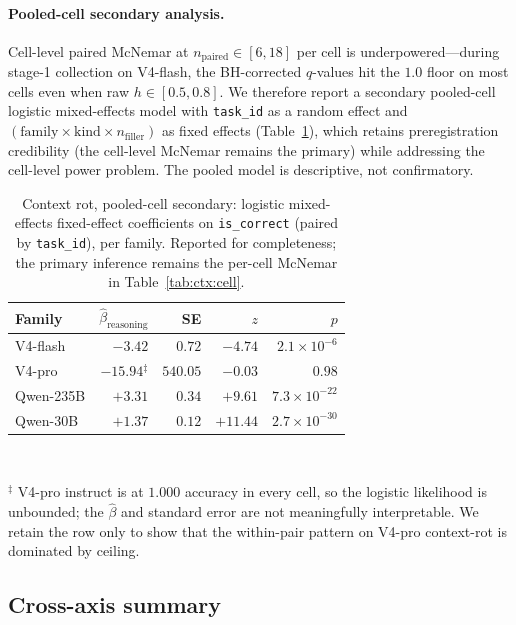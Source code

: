 \paragraph{Pooled-cell secondary analysis.}
Cell-level paired McNemar at $n_{\mathrm{paired}} \in [6, 18]$ per cell
is underpowered---during stage-1 collection on V4-flash, the BH-corrected
$q$-values hit the $1.0$ floor on most cells even when raw $h \in
[0.5, 0.8]$. We therefore report a secondary pooled-cell logistic
mixed-effects model with \texttt{task\_id} as a random effect and
$(\mathrm{family} \times \mathrm{kind} \times n_{\mathrm{filler}})$ as
fixed effects (Table~\ref{tab:ctx:pooled}), which retains
preregistration credibility (the cell-level McNemar remains the primary)
while addressing the cell-level power problem. The pooled model is
descriptive, not confirmatory.

\begin{table}[!htbp]
\centering\small
\caption{Context rot, pooled-cell secondary: logistic mixed-effects
fixed-effect coefficients on \texttt{is\_correct} (paired by
\texttt{task\_id}), per family. Reported for completeness; the primary
inference remains the per-cell McNemar in Table~\ref{tab:ctx:cell}.}
\label{tab:ctx:pooled}
\begin{tabular}{lrrrr}
\toprule
Family & $\hat{\beta}_{\mathrm{reasoning}}$ & SE & $z$ & $p$ \\
\midrule
V4-flash  & $-3.42$ & $0.72$ & $-4.74$ & $2.1{\times}10^{-6}$ \\
V4-pro    & $-15.94$$^\ddagger$ & $540.05$ & $-0.03$ & $0.98$ \\
Qwen-235B & $+3.31$ & $0.34$ & $+9.61$ & $7.3{\times}10^{-22}$ \\
Qwen-30B  & $+1.37$ & $0.12$ & $+11.44$ & $2.7{\times}10^{-30}$ \\
\bottomrule
\end{tabular}\\[2pt]
\raggedright\footnotesize $^\ddagger$ V4-pro instruct is at $1.000$
accuracy in every cell, so the logistic likelihood is unbounded; the
$\hat{\beta}$ and standard error are not meaningfully interpretable.
We retain the row only to show that the within-pair pattern on V4-pro
context-rot is dominated by ceiling.
\end{table}

\FloatBarrier

\subsection{Cross-axis summary}
\label{sec:results:cross}

